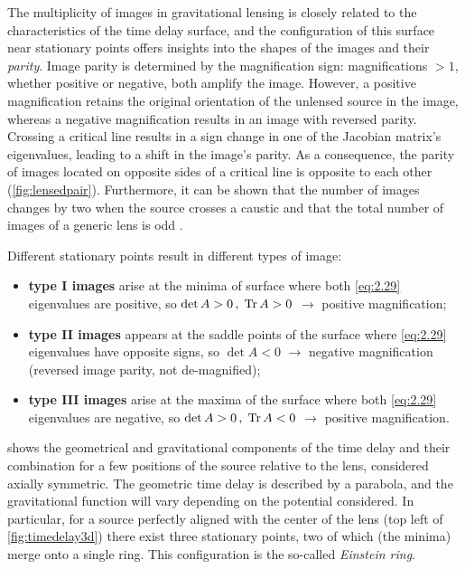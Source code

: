 The multiplicity of images in gravitational lensing is closely related to the characteristics of the time delay surface, and the configuration of this surface near stationary points offers insights into the shapes of the images and their \emph{parity}. Image parity is determined by the magnification sign: magnifications $>1$, whether positive or negative, both amplify the image. However, a positive magnification retains the original orientation of the unlensed source in the image, whereas a negative magnification results in an image with reversed parity.
Crossing a critical line results in a sign change in one of the Jacobian matrix's eigenvalues, leading to a shift in the image's parity. As a consequence, the parity of images located on opposite sides of a critical line is opposite to each other (\cref{fig:lensedpair}).
Furthermore, it can be shown that the number of images changes by two when the source crosses a caustic \citep{schneider_gravitational_1992} and that the total number of images of a generic lens is odd \citep{burke_multiple_1981}.

Different stationary points result in different types of image:
\begin{itemize}
    \item \textbf{type I images} arise at the minima of surface where both \cref{eq:2.29} eigenvalues are positive, so $\det A > 0 \,, \; \Tr A > 0$ $\rightarrow$ positive magnification;
    \item \textbf{type II images} appears at the saddle points of the surface where \cref{eq:2.29} eigenvalues have opposite signs, so $\det A < 0$ $\rightarrow$ negative magnification (\ie reversed image parity, not de-magnified);
    \item \textbf{type III images} arise at the maxima of the surface where both \cref{eq:2.29} eigenvalues are negative, so $\det A > 0 \,, \; \Tr A < 0$ $\rightarrow$ positive magnification.
\end{itemize}

 shows the geometrical and gravitational components of the time delay and their combination for a few positions of the source relative to the lens, considered axially symmetric. The geometric time delay is described by a parabola, and the gravitational function will vary depending on the potential considered.
In particular, for a source perfectly aligned with the center of the lens (top left of \cref{fig:timedelay3d}) there exist three stationary points, two of which (the minima) merge onto a single ring. This configuration is the so-called \emph{Einstein ring}. 

